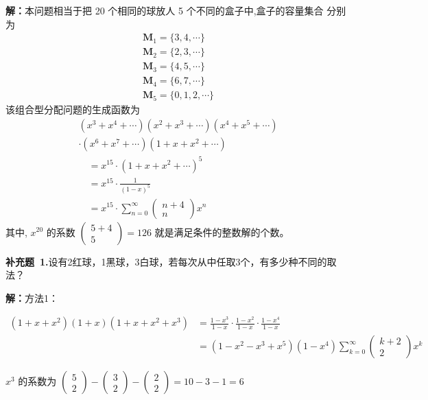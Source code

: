 \documentclass{report}
\begin{document}
\textbf{解：}本问题相当于把 20 个相同的球放人 5 个不同的盒子中,盒子的容量集合 分别为
$$
\begin{array}{l}
\boldsymbol{M}_{1}=\{3,4, \cdots\} \\
\boldsymbol{M}_{2}=\{2,3, \cdots\} \\
\boldsymbol{M}_{3}=\{4,5, \cdots\} \\
\boldsymbol{M}_{4}=\{6,7, \cdots\} \\
\boldsymbol{M}_{5}=\{0,1,2, \cdots\}
\end{array}
$$
该组合型分配问题的生成函数为
$$
\begin{array}{l}
\left(x^{3}+x^{4}+\cdots\right)\left(x^{2}+x^{3}+\cdots\right)\left(x^{4}+x^{5}+\cdots\right) \\
\cdot\left(x^{6}+x^{7}+\cdots\right)\left(1+x+x^{2}+\cdots\right) \\
\quad=x^{15} \cdot\left(1+x+x^{2}+\cdots\right)^{5} \\
\quad=x^{15} \cdot \frac{1}{(1-x)^{5}} \\
\quad=x^{15} \cdot \sum_{n=0}^{\infty}\left(\begin{array}{c}
n+4 \\
n
\end{array}\right) x^{n}
\end{array}
$$
其中, $x^{20}$ 的系数 $\left(\begin{array}{c}5+4 \\ 5\end{array}\right)=126$ 就是满足条件的整数解的个数。


\textbf{补充题\ 1.}设有2红球，1黑球，3白球，若每次从中任取3个，有多少种不同的取法？

\textbf{解：}方法1：

$\begin{aligned}\left(1+x+x^{2}\right)(1+x)\left(1+x+x^{2}+x^{3}\right) &=\frac{1-x^{3}}{1-x} \cdot \frac{1-x^{2}}{1-x} \cdot \frac{1-x^{4}}{1-x} \\ &=\left(1-x^{2}-x^{3}+x^{5}\right)\left(1-x^{4}\right) \sum_{k=0}^{\infty}\left(\begin{array}{c}k+2 \\ 2\end{array}\right) x^{k} \end{aligned}$

$x^{3}$ 的系数为 $\left(\begin{array}{l}5 \\ 2\end{array}\right)-\left(\begin{array}{l}3 \\ 2\end{array}\right)-\left(\begin{array}{l}2 \\ 2\end{array}\right)=10-3-1=6$
\end{document}
